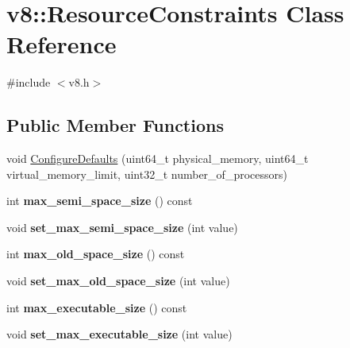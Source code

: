 \hypertarget{classv8_1_1ResourceConstraints}{}\section{v8\+:\+:Resource\+Constraints Class Reference}
\label{classv8_1_1ResourceConstraints}


{\ttfamily \#include $<$v8.\+h$>$}

\subsection*{Public Member Functions}
\begin{DoxyCompactItemize}
\item 
void \hyperlink{classv8_1_1ResourceConstraints_a6e5d38fd99d89d4fc10e325507d08d52}{Configure\+Defaults} (uint64\+\_\+t physical\+\_\+memory, uint64\+\_\+t virtual\+\_\+memory\+\_\+limit, uint32\+\_\+t number\+\_\+of\+\_\+processors)
\item 
\hypertarget{classv8_1_1ResourceConstraints_aeeecbbdb2c7880bf74d5d7fb9bbc52b3}{}int {\bfseries max\+\_\+semi\+\_\+space\+\_\+size} () const \label{classv8_1_1ResourceConstraints_aeeecbbdb2c7880bf74d5d7fb9bbc52b3}

\item 
\hypertarget{classv8_1_1ResourceConstraints_ac83efbf72458c872009f66019352409e}{}void {\bfseries set\+\_\+max\+\_\+semi\+\_\+space\+\_\+size} (int value)\label{classv8_1_1ResourceConstraints_ac83efbf72458c872009f66019352409e}

\item 
\hypertarget{classv8_1_1ResourceConstraints_a72840efdbcfc7bb287c6aea38d0b07b9}{}int {\bfseries max\+\_\+old\+\_\+space\+\_\+size} () const \label{classv8_1_1ResourceConstraints_a72840efdbcfc7bb287c6aea38d0b07b9}

\item 
\hypertarget{classv8_1_1ResourceConstraints_aa764be7c76b4baa3fce7a54c3777b5e9}{}void {\bfseries set\+\_\+max\+\_\+old\+\_\+space\+\_\+size} (int value)\label{classv8_1_1ResourceConstraints_aa764be7c76b4baa3fce7a54c3777b5e9}

\item 
\hypertarget{classv8_1_1ResourceConstraints_a037777e608ed1c22fe294ecef5722036}{}int {\bfseries max\+\_\+executable\+\_\+size} () const \label{classv8_1_1ResourceConstraints_a037777e608ed1c22fe294ecef5722036}

\item 
\hypertarget{classv8_1_1ResourceConstraints_a37d1b38672e9844c567823a119dcd557}{}void {\bfseries set\+\_\+max\+\_\+executable\+\_\+size} (int value)\label{classv8_1_1ResourceConstraints_a37d1b38672e9844c567823a119dcd557}


\end{DoxyCompactItemize}
